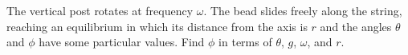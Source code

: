 The vertical post rotates at frequency $\omega$. The bead slides freely along the string,
reaching an equilibrium in which its distance from the axis is $r$ and the angles
$\theta$ and $\phi$ have some particular values. Find $\phi$ in terms of $\theta$,
$g$, $\omega$, and $r$.
\answercheck
